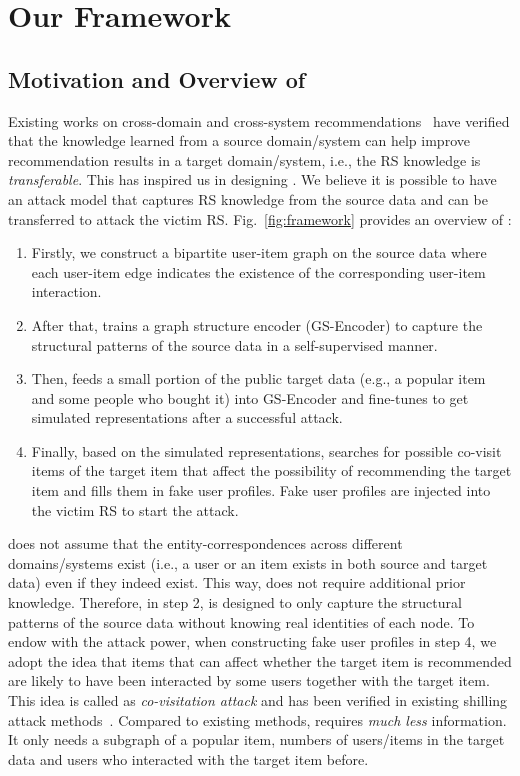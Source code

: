

\section{Our Framework \ours}
\label{sec:method}
\subsection{Motivation and Overview of \ours}


Existing works on cross-domain and cross-system recommendations~\citep{ZhaoPXZLY13,ZhuWCLOW18} have verified that the knowledge learned from a source domain/system can help improve recommendation results in a target domain/system, i.e., the RS knowledge is \emph{transferable}.
This has inspired us in designing \ours.
We believe it is possible to have an attack model that captures RS knowledge from the source data and can be transferred to attack the victim RS.
Fig.~\ref{fig:framework} provides an overview of \ours:

\begin{enumerate}
\item Firstly, we construct a bipartite user-item graph on the source data where each user-item edge indicates the existence of the corresponding user-item interaction.
\item After that, \ours trains a graph structure encoder (GS-Encoder) to capture the structural patterns of the source data in a self-supervised manner.
\item Then, \ours feeds a small portion of the public target data (e.g., a popular item and some people who bought it) into GS-Encoder and fine-tunes to get simulated representations after a successful attack.
\item Finally, based on the simulated representations, \ours searches for possible co-visit items of the target item that affect the possibility of recommending the target item and fills them in fake user profiles. Fake user profiles are injected into the victim RS to start the attack.
\end{enumerate}

\ours does not assume that the entity-correspondences across different domains/systems exist (i.e., a user or an item exists in both source and target data) even if they indeed exist.
This way, \ours does not require additional prior knowledge.
Therefore, in step 2, \ours is designed to only capture the structural patterns of the source data without knowing real identities of each node.
To endow \ours with the attack power, when constructing fake user profiles in step 4, we adopt the idea that items that can affect whether the target item is recommended are likely to have been interacted by some users together with the target item. 
This idea is called as \emph{co-visitation attack} and has been verified in existing shilling attack methods~\citep{YangGC17}.
Compared to existing methods, \ours requires \emph{much less} information.
It only needs a subgraph of a popular item, numbers of users/items in the target data and users who  interacted with the target item before.


